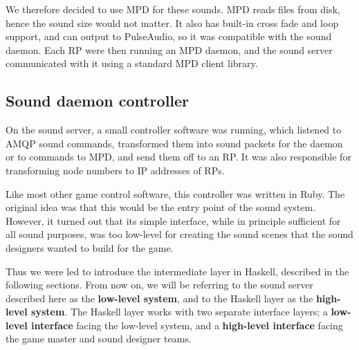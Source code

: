 We therefore decided to use MPD \cite{mpd} for these sounds. MPD reads
files from disk, hence the sound size would not matter. It also has built-in
cross fade and loop support, and can output to PulseAudio, so it was compatible with the sound daemon. Each RP were then running an MPD daemon,
and the sound server communicated with it using a standard MPD client library.

\subsection{Sound daemon controller}

On the sound server, a small controller software was running, which listened
to AMQP sound commands, transformed them into sound packets for the
daemon or to commands to MPD, and send them off to an RP. It was also responsible for transforming node numbers to IP addresses of RPs.

Like most other game control software, this controller was written in
Ruby. The original idea was that this would be the entry point of the
sound system. However, it turned out that its simple interface, while
in principle sufficient for all sound purposes, was too low-level for
creating the sound scenes that the sound designers wanted to build for
the game. 

Thus we were led to introduce the intermediate layer in Haskell,
described in the following sections. From now on, we will be referring
to the sound server described here as the \textbf{low-level system},
and to the Haskell layer as the \textbf{high-level system}. The
Haskell layer works with two separate interface layers; a
\textbf{low-level interface} facing the low-level system, and a
\textbf{high-level interface} facing the game master and sound
designer teams.


